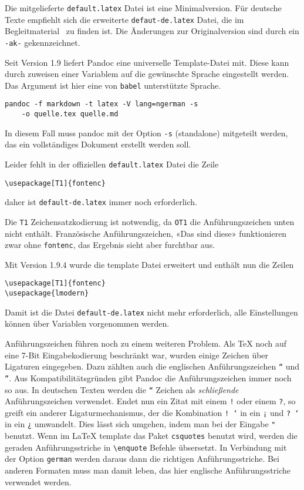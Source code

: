 \documentclass[11pt,ngerman,a4paper]{article}
\begin{document}
Die mitgelieferte \texttt{default.latex} Datei ist eine Minimalversion.
Für deutsche Texte empfiehlt sich die erweiterte
\texttt{defaut-de.latex} Datei, die im
Begleitmaterial~\autocite{Ziele-git} zu finden ist. Die Änderungen zur
Originalversion sind durch ein \texttt{-ak-} gekennzeichnet.

Seit Version 1.9 liefert Pandoc eine universelle Template-Datei mit.
Diese kann durch zuweisen einer Variablem auf die gewünschte Sprache
eingestellt werden. Das Argument ist hier eine von \texttt{babel}
unterstützte Sprache.

\begin{verbatim}
pandoc -f markdown -t latex -V lang=ngerman -s 
    -o quelle.tex quelle.md
\end{verbatim}

In diesem Fall muss pandoc mit der Option \texttt{-s} (standalone)
mitgeteilt werden, das ein vollständiges Dokument erstellt werden soll.

Leider fehlt in der offiziellen \texttt{default.latex} Datei die Zeile

\begin{verbatim}
\usepackage[T1]{fontenc}
\end{verbatim}

daher ist \texttt{default-de.latex} immer noch erforderlich.

Die \texttt{T1} Zeichensatzkodierung ist notwendig, da \texttt{OT1} die
Anführungszeichen unten nicht enthält. Französische Anführungszeichen,
«Das sind diese» funktionieren zwar ohne \texttt{fontenc}, das Ergebnis
sieht aber furchtbar aus.

Mit Version 1.9.4 wurde die template Datei erweitert und enthält nun die
Zeilen

\begin{verbatim}
\usepackage[T1]{fontenc}
\usepackage{lmodern}
\end{verbatim}

Damit ist die Datei \texttt{default-de.latex} nicht mehr erforderlich,
alle Einstellungen können über Variablen vorgenommen werden.

Anführungszeichen führen noch zu einem weiteren Problem. Als TeX noch
auf eine 7-Bit Eingabekodierung beschränkt war, wurden einige Zeichen
über Ligaturen eingegeben. Dazu zählten auch die englischen
Anführungszeichen \texttt{``} und \texttt{''}. Aus
Kompatibilitätsgründen gibt Pandoc die Anführungszeichen immer noch so
aus. In deutschen Texten werden die \texttt{``} Zeichen als
\emph{schließende} Anführungszeichen verwendet. Endet nun ein Zitat mit
einem \texttt{!} oder einem \texttt{?}, so greift ein anderer
Ligaturmechanismus, der die Kombination \texttt{! `} in ein \texttt{¡}
und \texttt{? `} in ein \texttt{¿} umwandelt. Dies lässt sich umgehen,
indem man bei der Eingabe \texttt{"} benutzt. Wenn im LaTeX template das
Paket \texttt{csquotes} benutzt wird, werden die geraden
Anführungsstriche in \texttt{\textbackslash{}enquote} Befehle
übsersetzt. In Verbindung mit der Option \texttt{german} werden daraus
dann die richtigen Anführungsstriche. Bei anderen Formaten muss man
damit leben, das hier englische Anführungsstriche verwendet werden.
\end{document}
